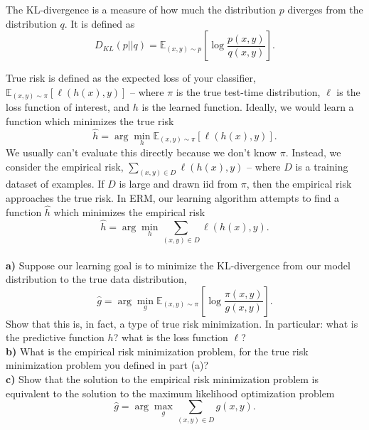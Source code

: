 \documentclass[a4paper]{article}
\begin{document}
The KL-divergence is a measure of how much the distribution $p$ diverges from the distribution $q$. It is defined as $$D_{KL}(p||q) = \mathbb{E}_{(x,y)\sim p} \left[\log\frac{p(x,y)}{q(x,y)}\right].$$

True risk is defined as the expected loss of your classifier, $\mathbb{E}_{(x,y)\sim\pi} \left[\ell(h(x),y)\right]$ -- where $\pi$ is the true test-time distribution, $\ell$ is the loss function of interest, and $h$ is the learned function. Ideally, we would learn a function which minimizes the true risk $$\hat h = \arg\min_h \mathbb{E}_{(x,y)\sim\pi} \left[\ell(h(x),y)\right].$$ We usually can't evaluate this directly because we don't know $\pi$. Instead, we consider the empirical risk, $\sum_{(x,y)\in D}\ell(h(x),y)$ -- where $D$ is a training dataset of examples. If $D$ is large and drawn iid from $\pi$, then the empirical risk approaches the true risk. In ERM, our learning algorithm attempts to find a function $\hat h$ which minimizes the empirical risk $$\hat h = \arg\min_h \sum_{(x,y)\in D}\ell(h(x),y).$$\\

\textbf{a)} Suppose our learning goal is to minimize the KL-divergence from our model distribution to the true data distribution, $$\hat g = \arg\min_g \mathbb{E}_{(x,y)\sim\pi} \left[\log\frac{\pi(x,y)}{g(x,y)}\right].$$ Show that this is, in fact, a type of true risk minimization. In particular: what is the predictive function $h$? what is the loss function $\ell$?\\

\textbf{b)} What is the empirical risk minimization problem, for the true risk minimization problem you defined in part (a)?\\

\textbf{c)} Show that the solution to the empirical risk minimization problem is equivalent to the solution to the maximum likelihood optimization problem $$\hat g = \arg\max_g \sum_{(x,y)\in D} g(x,y).$$
\end{document}
